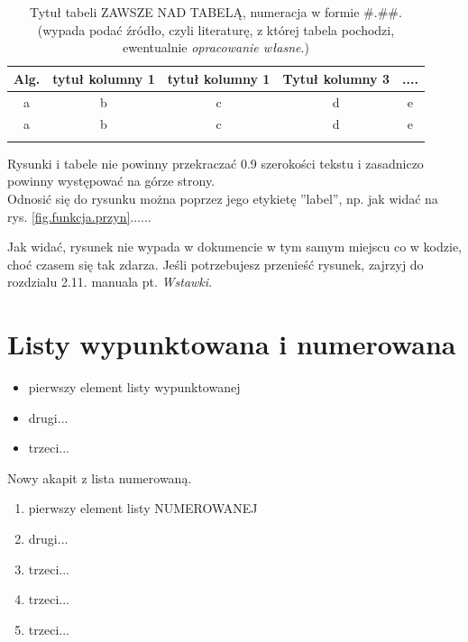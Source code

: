 \documentclass[12pt]{report}
\begin{document}
\begin{table}[!t]
\centering
\caption{Tytuł tabeli ZAWSZE NAD TABELĄ, numeracja w formie \#.\#\#. (wypada podać źródło, czyli literaturę,
z której tabela pochodzi, ewentualnie {\em opracowanie własne}.)} 

\label{tabls1}

{\footnotesize 
\vspace{5mm}
\begin{tabular}{c c c c c}
\hline\noalign{\smallskip}
{\bf Alg.} & {\bf tytuł kolumny 1} & {\bf tytuł kolumny 1} & {\bf Tytuł kolumny
3} & {\bf ....}     \\

\hline\noalign{\smallskip}
a & b & c & d & e  \vspace{3mm} \\ 
\noalign{\smallskip}
 a & b & c & d & e \\

\noalign{\smallskip}
\end{tabular}
}
\end{table}


Rysunki i tabele nie powinny przekraczać 0.9 szerokości tekstu i zasadniczo
powinny występować na górze strony. \\

\indent Odnosić się do rysunku można poprzez jego etykietę ''label'', np. jak widać na rys. \ref{fig.funkcja.przyn}......

Jak widać, rysunek nie wypada w dokumencie w tym samym miejscu co w kodzie, choć czasem się tak zdarza. Jeśli potrzebujesz przenieść rysunek, zajrzyj do rozdzialu 2.11. manuala pt. {\em Wstawki}. 

\section{Listy wypunktowana i numerowana}

\begin{itemize}
\item pierwszy element listy wypunktowanej
\item drugi...
\item trzeci...
\end{itemize}


Nowy akapit z lista numerowaną. 
\begin{enumerate}
 \item pierwszy element listy NUMEROWANEJ
 \item drugi...
 \item trzeci...
 \item trzeci...
 \item trzeci...
 \end{enumerate}
\end{document}
